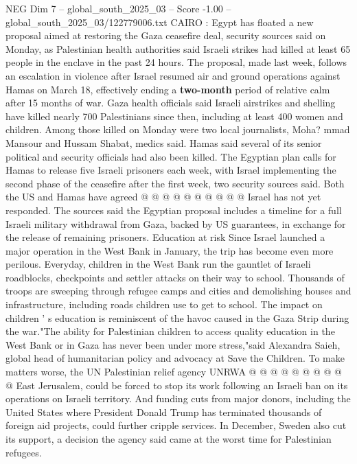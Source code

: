 \begin{textsample}{NEG Dim 7 – global\_south\_2025\_03 – Score -1.00 – global\_south\_2025\_03/122779006.txt}  \label{ex:f7_neg_027}
CAIRO : Egypt has floated a new proposal aimed at restoring the Gaza ceasefire deal, security sources said on Monday, as Palestinian health authorities said Israeli strikes had killed at least 65 people in the enclave in the past 24 hours.
The proposal, made last week, follows an escalation in violence after Israel resumed air and ground operations against Hamas on March 18, effectively ending a \textbf{two-month} period of relative calm after 15 months of war.
Gaza health officials said Israeli airstrikes and shelling have killed nearly 700 Palestinians since then, including at least 400 women and children.
Among those killed on Monday were two local journalists, Moha? mmad Mansour and Hussam Shabat, medics said.
Hamas said several of its senior political and security officials had also been killed.
The Egyptian plan calls for Hamas to release five Israeli prisoners each week, with Israel implementing the second phase of the ceasefire after the first week, two security sources said.
Both the US and Hamas have agreed @ @ @ @ @ @ @ @ @ @ Israel has not yet responded.
The sources said the Egyptian proposal includes a timeline for a full Israeli military withdrawal from Gaza, backed by US guarantees, in exchange for the release of remaining prisoners.
Education at risk Since Israel launched a major operation in the West Bank in January, the trip has become even more perilous.
Everyday, children in the West Bank run the gauntlet of Israeli roadblocks, checkpoints and settler attacks on their way to school.
Thousands of troops are sweeping through refugee camps and cities and demolishing houses and infrastructure, including roads children use to get to school.
The impact on children ' s education is reminiscent of the havoc caused in the Gaza Strip during the war."The ability for Palestinian children to access quality education in the West Bank or in Gaza has never been under more stress,"said Alexandra Saieh, global head of humanitarian policy and advocacy at Save the Children.
To make matters worse, the UN Palestinian relief agency UNRWA @ @ @ @ @ @ @ @ @ @ East Jerusalem, could be forced to stop its work following an Israeli ban on its operations on Israeli territory.
And funding cuts from major donors, including the United States where President Donald Trump has terminated thousands of foreign aid projects, could further cripple services.
In December, Sweden also cut its support, a decision the agency said came at the worst time for Palestinian refugees.

\end{textsample}
